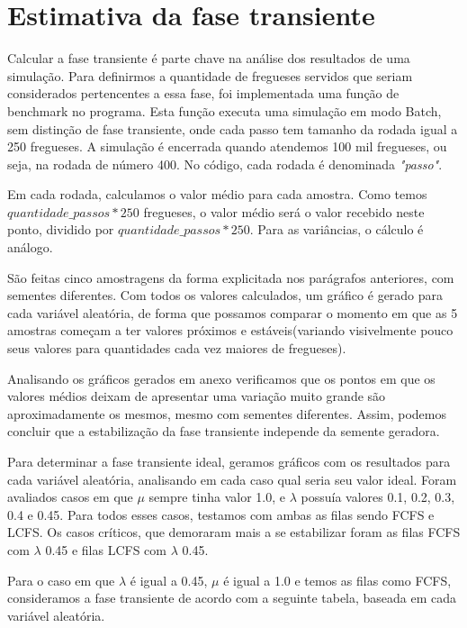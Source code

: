 \documentclass[a4paper,10pt]{article}
\begin{document}
\pagebreak

\section{Estimativa da fase transiente}

    Calcular a fase transiente é parte chave na análise dos resultados de uma simulação. Para definirmos a quantidade de fregueses servidos que seriam considerados pertencentes a essa fase, foi implementada uma função de benchmark no programa. Esta função executa uma simulação em modo Batch, sem distinção de fase transiente, onde cada passo tem tamanho da rodada igual a 250 fregueses. A simulação é encerrada quando atendemos 100 mil fregueses, ou seja, na rodada de número 400. No código, cada rodada é denominada \emph{"passo"}.

    Em cada rodada, calculamos o valor médio para cada amostra. Como temos $quantidade\_passos * 250$ fregueses, o valor médio será o valor recebido neste ponto, dividido por $quantidade\_passos * 250$. Para as variâncias, o cálculo é análogo.

    São feitas cinco amostragens da forma explicitada nos parágrafos anteriores, com sementes diferentes. Com todos os valores calculados, um gráfico é gerado para cada variável aleatória, de forma que possamos comparar o momento em que as 5 amostras começam a ter valores próximos e estáveis(variando visivelmente pouco seus valores para quantidades cada vez maiores de fregueses).

    Analisando os gráficos gerados em anexo verificamos que os pontos em que os valores médios deixam de apresentar uma variação muito grande são aproximadamente os mesmos, mesmo com sementes diferentes. Assim, podemos concluir que a estabilização da fase transiente independe da semente geradora.

    Para determinar a fase transiente ideal, geramos gráficos com os resultados para cada variável aleatória, analisando em cada caso qual seria seu valor ideal. Foram avaliados casos em que $\mu$ sempre tinha valor 1.0, e $\lambda$ possuía valores 0.1, 0.2, 0.3, 0.4 e 0.45. Para todos esses casos, testamos com ambas as filas sendo FCFS e LCFS. Os casos críticos, que demoraram mais a se estabilizar foram as filas FCFS com $\lambda$ 0.45 e filas LCFS com $\lambda$ 0.45.

    Para o caso em que $\lambda$ é igual a 0.45, $\mu$ é igual a 1.0 e temos as filas como FCFS, consideramos a fase transiente de acordo com a seguinte tabela, baseada em cada variável aleatória.
\end{document}
